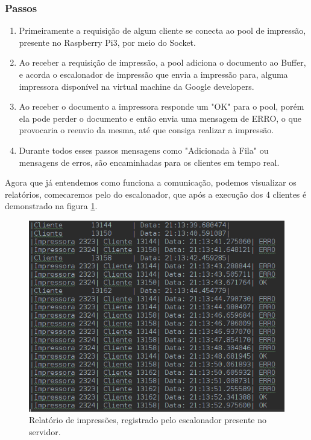 \documentclass[12pt]{article}
\begin{document}
 \subsubsection{Passos}
 \begin{enumerate}

\item Primeiramente a requisição de algum cliente se conecta ao pool de impressão, presente no Raspberry Pi3, por meio do Socket.

\item Ao receber a requisição de impressão, a pool adiciona o documento ao Buffer, e acorda o escalonador de impressão que envia a impressão para, alguma impressora disponível na virtual machine da Google developers.

\item Ao receber o documento a impressora responde um "OK" para o pool, porém ela pode perder o documento e então envia uma mensagem de ERRO, o que provocaria o reenvio da mesma, até que consiga realizar a impressão.

\item Durante todos esses passos mensagens como "Adicionada à Fila" ou mensagens de erros, são encaminhadas para os clientes em tempo real.

\end{enumerate}
Agora que já entendemos como funciona a comunicação, podemos visualizar os relatórios, comecaremos pelo do escalonador, que após a execução dos 4 clientes é demonstrado na figura \ref{fig:screenshot009}.


 \begin{figure}[H]
 	\centering
 	\includegraphics[width=0.7\linewidth]{imagens/screenshot014}
 	\caption{Relatório de impressões, registrado pelo escalonador presente no servidor.}
 	\label{fig:screenshot009}
 \end{figure}
\end{document}
